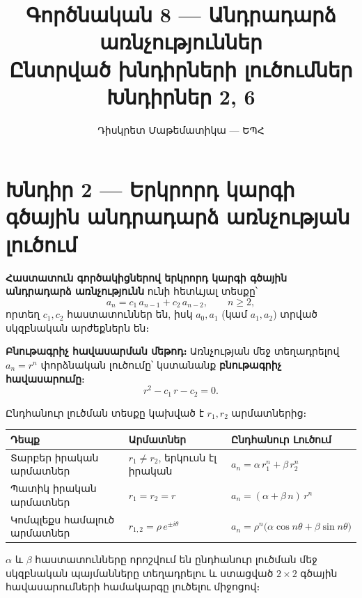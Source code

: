 \documentclass[12pt, a4paper]{article}
\title{\textbf{Գործնական 8 — Անդրադարձ առնչություններ}\\[4pt]
       \large Ընտրված խնդիրների լուծումներ\\[2pt]
       \normalsize Խնդիրներ 2, 6}
\author{Դիսկրետ Մաթեմատիկա — ԵՊՀ}
\date{}
\begin{document}
\maketitle
\tableofcontents
\newpage

\section{Խնդիր 2 — Երկրորդ կարգի գծային անդրադարձ առնչության լուծում}

\begin{theorybox}
\textbf{Հաստատուն գործակիցներով երկրորդ կարգի գծային անդրադարձ առնչությունն} ունի հետևյալ տեսքը՝
\[
  a_n = c_1\, a_{n-1} + c_2\, a_{n-2}, \qquad n \ge 2,
\]
որտեղ $c_1, c_2$ հաստատուններ են, իսկ $a_0, a_1$ (կամ $a_1, a_2$) տրված սկզբնական արժեքներն են։

\medskip
\textbf{Բնութագրիչ հավասարման մեթոդ։}\;
Առնչության մեջ տեղադրելով $a_n = r^n$ փորձնական լուծումը՝ կստանանք \textbf{բնութագրիչ հավասարումը}։
\[
  r^2 - c_1\, r - c_2 = 0.
\]

Ընդհանուր լուծման տեսքը կախված է $r_1, r_2$ արմատներից։

\medskip
\begin{center}
\renewcommand{\arraystretch}{1.5}
\begin{tabular}{lll}
\toprule
\textbf{Դեպք} & \textbf{Արմատներ} & \textbf{Ընդհանուր Լուծում} \\
\midrule
Տարբեր իրական արմատներ & $r_1 \neq r_2$, երկուսն էլ իրական
  & $a_n = \alpha\, r_1^n + \beta\, r_2^n$ \\
Պատիկ իրական արմատներ & $r_1 = r_2 = r$
  & $a_n = (\alpha + \beta\, n)\, r^n$ \\
Կոմպլեքս համալուծ արմատներ & $r_{1,2} = \rho\, e^{\pm i\theta}$
  & $a_n = \rho^n\bigl(\alpha \cos n\theta + \beta \sin n\theta\bigr)$ \\
\bottomrule
\end{tabular}
\end{center}

\medskip
$\alpha$ և $\beta$ հաստատունները որոշվում են ընդհանուր լուծման մեջ սկզբնական պայմանները տեղադրելու և ստացված $2 \times 2$ գծային հավասարումների համակարգը լուծելու միջոցով։


\end{theorybox}
\end{document}
